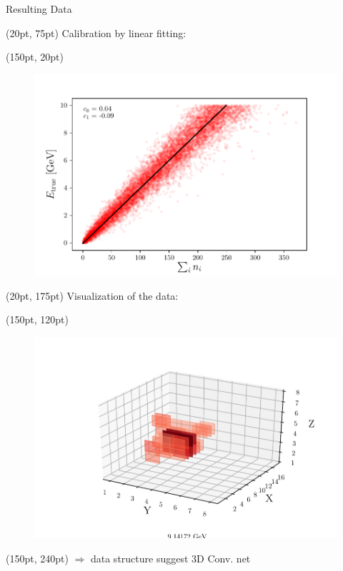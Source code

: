 \documentclass[10pt]{beamer}
\begin{document}
\begin{frame}{Resulting Data}
  \begin{textblock*}{250pt}(20pt, 75pt)
    Calibration by linear fitting:
  \end{textblock*}
  \begin{textblock*}{150pt}(150pt, 20pt)
    \begin{figure}[htp]
      \includegraphics[width=\textwidth]{../images/e-vs-sum_n_fit.png}
    \end{figure}
  \end{textblock*}
  \begin{textblock*}{250pt}(20pt, 175pt)
    Visualization of the data:
  \end{textblock*}
  \begin{textblock*}{135pt}(150pt, 120pt)
    \begin{figure}[htp]
      \includegraphics[width=1.1\textwidth]{../images/data_display.png}
    \end{figure}
  \end{textblock*}
  \begin{textblock*}{250pt}(150pt, 240pt)
    $\Rightarrow$ data structure suggest 3D Conv. net
  \end{textblock*}
\end{frame}
\end{document}
